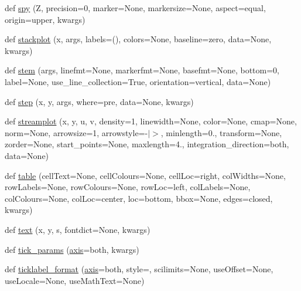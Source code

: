 \begin{DoxyCompactItemize}
\item 
def \hyperlink{namespacematplotlib_1_1pyplot_a32b63653836f297eda0b70ce1cd209b2}{spy} (Z, precision=0, marker=None, markersize=None, aspect=\textquotesingle{}equal\textquotesingle{}, origin=\textquotesingle{}upper\textquotesingle{}, kwargs)
\item 
def \hyperlink{namespacematplotlib_1_1pyplot_a08dd04b6abdd5a029f77ef143a962e30}{stackplot} (x, args, labels=(), colors=None, baseline=\textquotesingle{}zero\textquotesingle{}, data=None, kwargs)
\item 
def \hyperlink{namespacematplotlib_1_1pyplot_a4c7b267caec137ccf2756d71264fd5c1}{stem} (args, linefmt=None, markerfmt=None, basefmt=None, bottom=0, label=None, use\+\_\+line\+\_\+collection=True, orientation=\textquotesingle{}vertical\textquotesingle{}, data=None)
\item 
def \hyperlink{namespacematplotlib_1_1pyplot_aca542311792dd05bf78c09dcfcb72ca0}{step} (x, y, args, where=\textquotesingle{}pre\textquotesingle{}, data=None, kwargs)
\item 
def \hyperlink{namespacematplotlib_1_1pyplot_a67a95d4f9436353c7236304ff7bb8a94}{streamplot} (x, y, u, v, density=1, linewidth=None, color=None, cmap=None, norm=None, arrowsize=1, arrowstyle=\textquotesingle{}-\/$\vert$$>$\textquotesingle{}, minlength=0., transform=None, zorder=None, start\+\_\+points=None, maxlength=4., integration\+\_\+direction=\textquotesingle{}both\textquotesingle{}, data=None)
\item 
def \hyperlink{namespacematplotlib_1_1pyplot_a21de0572325a3d9ac97579dec3aea9d5}{table} (cell\+Text=None, cell\+Colours=None, cell\+Loc=\textquotesingle{}right\textquotesingle{}, col\+Widths=None, row\+Labels=None, row\+Colours=None, row\+Loc=\textquotesingle{}left\textquotesingle{}, col\+Labels=None, col\+Colours=None, col\+Loc=\textquotesingle{}center\textquotesingle{}, loc=\textquotesingle{}bottom\textquotesingle{}, bbox=None, edges=\textquotesingle{}closed\textquotesingle{}, kwargs)
\item 
def \hyperlink{namespacematplotlib_1_1pyplot_a88aae7706a5442308884b8726d64a505}{text} (x, y, s, fontdict=None, kwargs)
\item 
def \hyperlink{namespacematplotlib_1_1pyplot_a7e3389a55f1ab84f5fb9b6c487b380a1}{tick\+\_\+params} (\hyperlink{namespacematplotlib_1_1pyplot_a491a6aa585ceb1955264031156654647}{axis}=\textquotesingle{}both\textquotesingle{}, kwargs)
\item 
def \hyperlink{namespacematplotlib_1_1pyplot_a1ef2a77c57a95fa61780394fee9d64bd}{ticklabel\+\_\+format} (\hyperlink{namespacematplotlib_1_1pyplot_a491a6aa585ceb1955264031156654647}{axis}=\textquotesingle{}both\textquotesingle{}, style=\textquotesingle{}\textquotesingle{}, scilimits=None, use\+Offset=None, use\+Locale=None, use\+Math\+Text=None)
$$
\end{DoxyCompactItemize}
